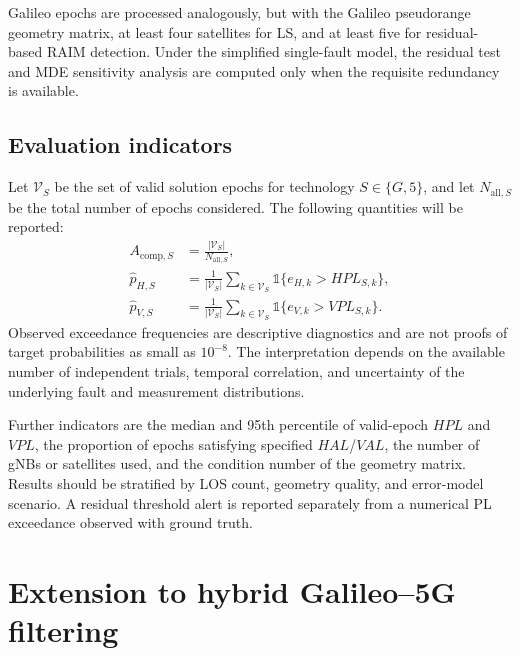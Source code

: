 \documentclass[pdflatex,sn-mathphys-num]{sn-jnl}
\begin{document}
Galileo epochs are processed analogously, but with the Galileo
pseudorange geometry matrix, at least four satellites for LS, and
at least five for residual-based RAIM detection. Under the simplified
single-fault model, the residual test and MDE sensitivity analysis are
computed only when the requisite redundancy is available.

\subsection{Evaluation indicators}\label{sec:metrics}

Let $\mathcal{V}_S$ be the set of valid solution epochs for technology
$S\in\{G,5\}$, and let $N_{\mathrm{all},S}$ be the total number of
epochs considered. The following quantities will be reported:
\begin{align}
 A_{\mathrm{comp},S}&=\frac{|\mathcal{V}_S|}{N_{\mathrm{all},S}},
 \label{eq:Acomp}\\
 \widehat p_{H,S}&=\frac{1}{|\mathcal{V}_S|}
 \sum_{k\in\mathcal{V}_S}\mathbb{1}\{e_{H,k}>HPL_{S,k}\},
 \label{eq:pHobs}\\
 \widehat p_{V,S}&=\frac{1}{|\mathcal{V}_S|}
 \sum_{k\in\mathcal{V}_S}\mathbb{1}\{e_{V,k}>VPL_{S,k}\}.
 \label{eq:pVobs}
\end{align}
Observed exceedance frequencies are descriptive diagnostics and are not
proofs of target probabilities as small as $10^{-8}$.
The interpretation depends on the available number of independent
trials, temporal correlation, and uncertainty of the underlying
fault and measurement distributions.

Further indicators are the median and 95th percentile of valid-epoch
$HPL$ and $VPL$, the proportion of epochs satisfying specified
$HAL$/$VAL$, the number of gNBs or satellites used, and the
condition number of the geometry matrix. Results should be stratified
by LOS count, geometry quality, and error-model scenario. A residual
threshold alert is reported separately from a numerical PL
exceedance observed with ground truth.

\section{Extension to hybrid Galileo--5G filtering}\label{sec:ekf}
\end{document}
